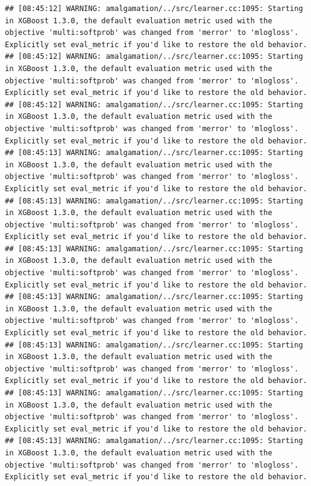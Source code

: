\documentclass[
]{scrbook}
\begin{document}
\begin{verbatim}
## [08:45:12] WARNING: amalgamation/../src/learner.cc:1095: Starting in XGBoost 1.3.0, the default evaluation metric used with the objective 'multi:softprob' was changed from 'merror' to 'mlogloss'. Explicitly set eval_metric if you'd like to restore the old behavior.
## [08:45:12] WARNING: amalgamation/../src/learner.cc:1095: Starting in XGBoost 1.3.0, the default evaluation metric used with the objective 'multi:softprob' was changed from 'merror' to 'mlogloss'. Explicitly set eval_metric if you'd like to restore the old behavior.
## [08:45:12] WARNING: amalgamation/../src/learner.cc:1095: Starting in XGBoost 1.3.0, the default evaluation metric used with the objective 'multi:softprob' was changed from 'merror' to 'mlogloss'. Explicitly set eval_metric if you'd like to restore the old behavior.
## [08:45:13] WARNING: amalgamation/../src/learner.cc:1095: Starting in XGBoost 1.3.0, the default evaluation metric used with the objective 'multi:softprob' was changed from 'merror' to 'mlogloss'. Explicitly set eval_metric if you'd like to restore the old behavior.
## [08:45:13] WARNING: amalgamation/../src/learner.cc:1095: Starting in XGBoost 1.3.0, the default evaluation metric used with the objective 'multi:softprob' was changed from 'merror' to 'mlogloss'. Explicitly set eval_metric if you'd like to restore the old behavior.
## [08:45:13] WARNING: amalgamation/../src/learner.cc:1095: Starting in XGBoost 1.3.0, the default evaluation metric used with the objective 'multi:softprob' was changed from 'merror' to 'mlogloss'. Explicitly set eval_metric if you'd like to restore the old behavior.
## [08:45:13] WARNING: amalgamation/../src/learner.cc:1095: Starting in XGBoost 1.3.0, the default evaluation metric used with the objective 'multi:softprob' was changed from 'merror' to 'mlogloss'. Explicitly set eval_metric if you'd like to restore the old behavior.
## [08:45:13] WARNING: amalgamation/../src/learner.cc:1095: Starting in XGBoost 1.3.0, the default evaluation metric used with the objective 'multi:softprob' was changed from 'merror' to 'mlogloss'. Explicitly set eval_metric if you'd like to restore the old behavior.
## [08:45:13] WARNING: amalgamation/../src/learner.cc:1095: Starting in XGBoost 1.3.0, the default evaluation metric used with the objective 'multi:softprob' was changed from 'merror' to 'mlogloss'. Explicitly set eval_metric if you'd like to restore the old behavior.
## [08:45:13] WARNING: amalgamation/../src/learner.cc:1095: Starting in XGBoost 1.3.0, the default evaluation metric used with the objective 'multi:softprob' was changed from 'merror' to 'mlogloss'. Explicitly set eval_metric if you'd like to restore the old behavior.

\end{verbatim}
\end{document}

